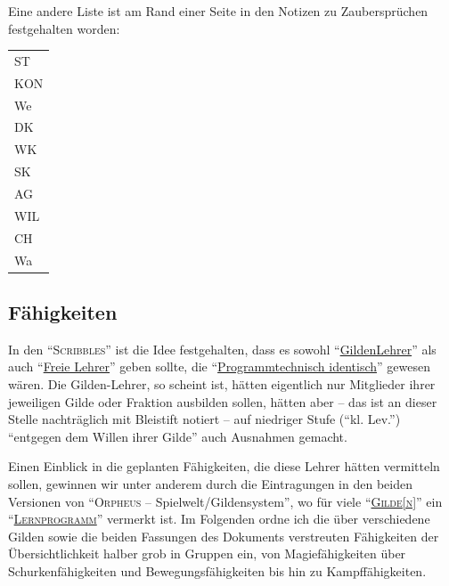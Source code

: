\documentclass[a5paper,pagesize,numbers=noenddot]{scrbook}
\begin{document}
Eine andere Liste ist am Rand einer Seite in den Notizen zu Zaubersprüchen festgehalten worden:

\vspace{1em}
\begin{tabular}{l}
   ST    \\
   KON   \\
   We    \\
   DK    \\
   WK    \\
   SK    \\
   AG    \\
   WIL   \\
   CH    \\
   Wa    \\\hline
\end{tabular}


\subsection{Fähigkeiten}\label{sec:orpheus_mechanik_faehigkeiten}
In den \enquote{\textsc{Scribbles}} ist die Idee festgehalten, dass es sowohl \enquote{\uline{Gilden\-Lehrer}} als auch \enquote{\uline{Freie Lehrer}} geben sollte, die \enquote{\uline{Programmtechnisch identisch}} gewesen wären.
Die Gilden-Lehrer, so scheint ist, hätten eigentlich nur Mitglieder ihrer jeweiligen Gilde oder Fraktion ausbilden sollen, hätten aber -- das ist an dieser Stelle nachträglich mit Bleistift notiert -- auf niedriger Stufe (\enquote{kl. Lev.}) \enquote{entgegen dem Willen ihrer Gilde} auch Ausnahmen gemacht.\autocite[S.~15]{orpheus_b_scribbles}

Einen Einblick in die geplanten Fähigkeiten, die diese Lehrer hätten vermitteln sollen, gewinnen wir unter anderem durch die Eintragungen in den beiden Versionen von \enquote{\textsc{Orpheus} -- Spielwelt/Gildensystem}, wo für viele \enquote{\textsc{\uline{Gilde[n]}}} ein \enquote{\textsc{\uline{Lernprogramm}}} vermerkt ist.
Im Folgenden ordne ich die über verschiedene Gilden sowie die beiden Fassungen des Dokuments verstreuten Fähigkeiten der Übersichtlichkeit halber grob in Gruppen ein, von Magiefähigkeiten über Schurkenfähigkeiten und Bewegungsfähigkeiten bis hin zu Kampffähigkeiten.
\end{document}
